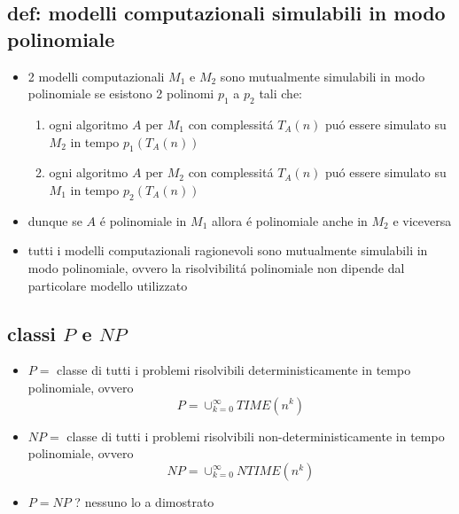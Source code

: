 \subsection*{def: modelli computazionali simulabili in modo polinomiale}
\begin{flushleft}
	\begin{itemize}
		\item 2 modelli computazionali $M_1$ e $M_2$ sono mutualmente simulabili in modo polinomiale se esistono 2 polinomi $p_1$ a $p_2$ tali che:
		\begin{enumerate}
			\item ogni algoritmo  $A$ per $M_1$ con complessit\'a $T_A(n)$ pu\'o essere simulato su $M_2$ in tempo $p_1(T_A(n))$
			\item ogni algoritmo  $A$ per $M_2$ con complessit\'a $T_A(n)$ pu\'o essere simulato su $M_1$ in tempo $p_2(T_A(n))$
		\end{enumerate}
		\item dunque se $A$ \'e polinomiale in $M_1$ allora \'e polinomiale anche in $M_2$ e viceversa
		\item tutti i modelli computazionali ragionevoli sono mutualmente simulabili in modo polinomiale, ovvero la risolvibilit\'a polinomiale non dipende dal particolare modello utilizzato
	\end{itemize}
\end{flushleft}


\subsection*{classi $P$ e $NP$}
\begin{flushleft}
	\begin{itemize}
		\item $P=$ classe di tutti i problemi risolvibili deterministicamente in tempo polinomiale, ovvero
			$$P=\cup_{k=0}^{\infty}TIME(n^k)$$
		\item $NP=$ classe di tutti i problemi risolvibili non-deterministicamente in tempo polinomiale, ovvero
			$$NP=\cup_{k=0}^{\infty}NTIME(n^k)$$
		\item $P=NP$ ? nessuno lo a dimostrato
	\end{itemize}
\end{flushleft}

